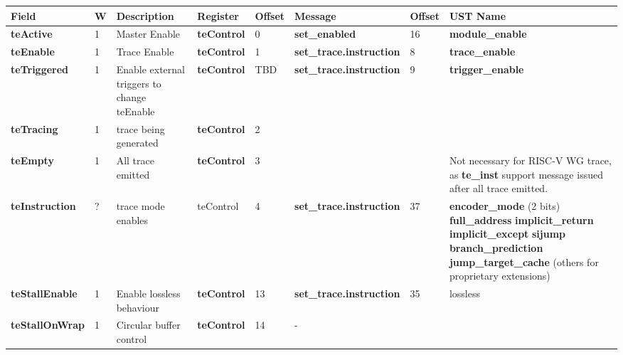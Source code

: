 \begin{table}[htp]
\begin{tabulary}{\textwidth}{|l|l|p{15mm}|l|p{10mm}|l|p{15mm}|p{15mm}}
    \hline
    {\bf Field} & {\bf W} & {\bf Description} & {\bf Register} & {\bf Offset} & {\bf Message} & {\bf Offset} & {\bf UST Name} \\
    \hline
    \textbf {teActive} & 1 & Master Enable & \textbf {teControl} & 0 & \textbf {set\_enabled} & 16 & \textbf {module\_enable}\\
    \hline  
    \textbf {teEnable} & 1 & Trace Enable & \textbf{teControl} & 1 & \textbf {set\_trace.instruction} & 8 & \textbf {trace\_enable}\\     
    \hline
    \textbf{teTriggered} & 1 & Enable external triggers to change teEnable & \textbf {teControl} & TBD & \textbf {set\_trace.instruction} & 9 & \textbf {trigger\_enable}\\
    \hline
    \textbf{teTracing} & 1 & trace being generated & \textbf{teControl} & 2 & & \\
    \hline
    \textbf{teEmpty} & 1 & All trace emitted & \textbf{teControl} & 3 & & & Not necessary for RISC-V WG trace, as \textbf {te\_inst} support message issued after all trace emitted.\\
    \hline
    \textbf{teInstruction} & ? & trace mode enables & teControl & 4 & \textbf{set\_trace.instruction} & 37\newline & 
    \textbf {encoder\_mode} (2 bits)\newline
    \textbf{full\_address}\newline
    \textbf{implicit\_return}\newline
    \textbf{implicit\_except}\newline
    \textbf{sijump}\newline
    \textbf{branch\_prediction}\newline
    \textbf{jump\_target\_cache}\newline
    (others for proprietary extensions)\\
    \hline
    \textbf{teStallEnable} & 1 & Enable lossless behaviour & \textbf{teControl} & 13 & \textbf{set\_trace.instruction} & 35 & lossless\\
    \hline
    \textbf{teStallOnWrap} & 1 & Circular buffer control & \textbf{teControl} & 14	& - & \\
    \hline

\end{tabulary}
\end{table}
